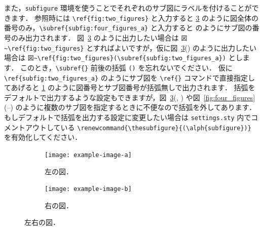 また，\verb|subfigure| 環境を使うことでそれぞれのサブ図にラベルを付けることができます．
参照時には \verb|\ref{fig:two_figures}| と入力すると \ref{fig:two_figures} のように図全体の番号のみ，\verb|\subref{subfig:four_figures_a}| と入力すると  のようにサブ図の番号のみ出力されます．
図~\ref{fig:two_figures} のように出力したい場合は \verb|図~\ref{fig:two_figures}| とすればよいですが，仮に図~\ref{fig:two_figures}() のように出力したい場合は \verb|図~\ref{fig:two_figures}(\subref{subfig:two_figures_a})| とします．
このとき，\verb|\subref{}| 前後の括弧 \verb|()| を忘れないでください．
仮に \verb|\ref{subfig:two_figures_a}| のようにサブ図を \verb|\ref{}| コマンドで直接指定してあげると \ref{subfig:two_figures_a} のように図番号とサブ図番号が括弧無しで出力されます．
括弧をデフォルトで出力するような設定もできますが，図~\ref{fig:two_figures}(, ) や図~\ref{fig:four_figures}(--) のように複数のサブ図を指定するときに不便なので括弧を外してあります．
もしデフォルトで括弧を出力する設定に変更したい場合は \verb|settings.sty| 内でコメントアウトしている \verb|\renewcommand{\thesubfigure}{(\alph{subfigure})}| を有効化してください．

\begin{figure}[tp]
    \centering
    \begin{subfigure}{0.45\columnwidth}
        \centering
        \texttt{[image: example-image-a]}
        \caption{左の図．}
        \label{subfig:two_figures_a}
    \end{subfigure}
    \hfill %
    \begin{subfigure}{0.45\columnwidth}
        \centering
        \texttt{[image: example-image-b]}
        \caption{右の図．}
        \label{subfig:two_figures_b}
    \end{subfigure}
    \caption{左右の図．}
    \label{fig:two_figures}
\end{figure}

